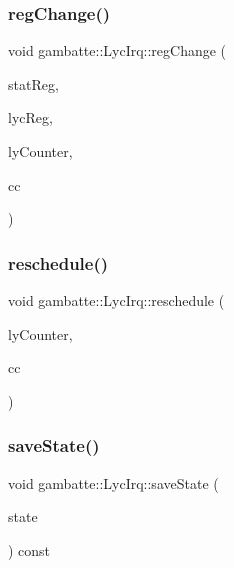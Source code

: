 \mbox{\label{classgambatte_1_1LycIrq_a1c55846be851069006470cf938d55af5}} 
\subsubsection{\texorpdfstring{reg\+Change()}{regChange()}}
{\footnotesize\ttfamily void gambatte\+::\+Lyc\+Irq\+::reg\+Change (\begin{DoxyParamCaption}\item[{unsigned}]{stat\+Reg,  }\item[{unsigned}]{lyc\+Reg,  }\item[{\hyperlink{classgambatte_1_1LyCounter}{Ly\+Counter} const \&}]{ly\+Counter,  }\item[{unsigned}]{cc }\end{DoxyParamCaption})\hspace{0.3cm}{\ttfamily [private]}}

\mbox{\label{classgambatte_1_1LycIrq_ab692c00c8c9083c651302b3a78146530}} 
\subsubsection{\texorpdfstring{reschedule()}{reschedule()}}
{\footnotesize\ttfamily void gambatte\+::\+Lyc\+Irq\+::reschedule (\begin{DoxyParamCaption}\item[{\hyperlink{classgambatte_1_1LyCounter}{Ly\+Counter} const \&}]{ly\+Counter,  }\item[{unsigned}]{cc }\end{DoxyParamCaption})}

\mbox{\label{classgambatte_1_1LycIrq_ad0e92af711e022f3d04f26849ca5210b}} 
\subsubsection{\texorpdfstring{save\+State()}{saveState()}}
{\footnotesize\ttfamily void gambatte\+::\+Lyc\+Irq\+::save\+State (\begin{DoxyParamCaption}\item[{\hyperlink{structgambatte_1_1SaveState}{Save\+State} \&}]{state }\end{DoxyParamCaption}) const}

